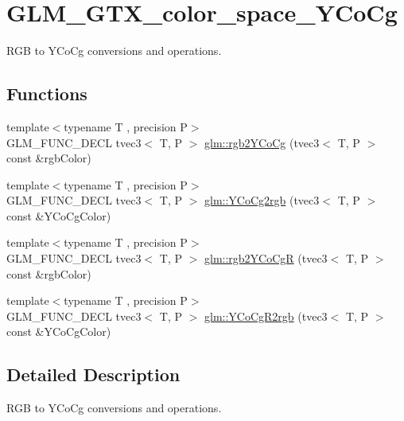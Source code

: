 \hypertarget{group__gtx__color__space___y_co_cg}{}\section{G\+L\+M\+\_\+\+G\+T\+X\+\_\+color\+\_\+space\+\_\+\+Y\+Co\+Cg}
\label{group__gtx__color__space___y_co_cg}


R\+G\+B to Y\+Co\+Cg conversions and operations.  


\subsection*{Functions}
\begin{DoxyCompactItemize}
\item 
{\footnotesize template$<$typename T , precision P$>$ }\\G\+L\+M\+\_\+\+F\+U\+N\+C\+\_\+\+D\+E\+C\+L tvec3$<$ T, P $>$ \hyperlink{group__gtx__color__space___y_co_cg_ga19481f6947c5b5482debd41e71b8c941}{glm\+::rgb2\+Y\+Co\+Cg} (tvec3$<$ T, P $>$ const \&rgb\+Color)
\item 
{\footnotesize template$<$typename T , precision P$>$ }\\G\+L\+M\+\_\+\+F\+U\+N\+C\+\_\+\+D\+E\+C\+L tvec3$<$ T, P $>$ \hyperlink{group__gtx__color__space___y_co_cg_ga6d7e988a79b299ca1fa59f537e13800b}{glm\+::\+Y\+Co\+Cg2rgb} (tvec3$<$ T, P $>$ const \&Y\+Co\+Cg\+Color)
\item 
{\footnotesize template$<$typename T , precision P$>$ }\\G\+L\+M\+\_\+\+F\+U\+N\+C\+\_\+\+D\+E\+C\+L tvec3$<$ T, P $>$ \hyperlink{group__gtx__color__space___y_co_cg_ga2e534594cc8ad252d23b14fb363ae9e2}{glm\+::rgb2\+Y\+Co\+Cg\+R} (tvec3$<$ T, P $>$ const \&rgb\+Color)
\item 
{\footnotesize template$<$typename T , precision P$>$ }\\G\+L\+M\+\_\+\+F\+U\+N\+C\+\_\+\+D\+E\+C\+L tvec3$<$ T, P $>$ \hyperlink{group__gtx__color__space___y_co_cg_ga4bac5462c00df0ae89242ecdbbe5dbad}{glm\+::\+Y\+Co\+Cg\+R2rgb} (tvec3$<$ T, P $>$ const \&Y\+Co\+Cg\+Color)
\end{DoxyCompactItemize}


\subsection{Detailed Description}
R\+G\+B to Y\+Co\+Cg conversions and operations. 

